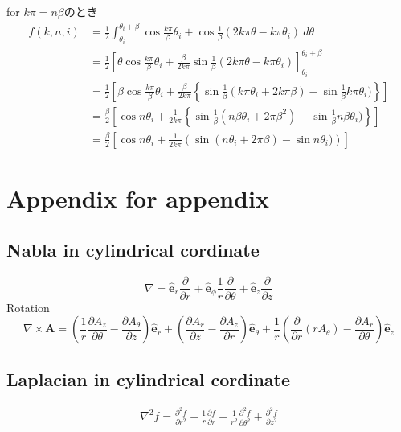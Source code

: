 \documentclass[a4paper, 11pt]{article}
\begin{document}
for $k\pi= n\beta$のとき
\begin{align}
    f(k,n,i) &= \frac{1}{2}\int_{\theta_i}^{\theta_i+\beta} \cos\frac{k\pi}{\beta}\theta_i + \cos \frac{1}{\beta} (2k\pi\theta-k\pi\theta_i)~d\theta\\
    & = \frac{1}{2}\left[\theta\cos\frac{k\pi}{\beta}\theta_i + \frac{\beta}{2k\pi}\sin\frac{1}{\beta} (2k\pi\theta-k\pi\theta_i)\right]_{\theta_i}^{\theta_i+\beta}\\
    & = \frac{1}{2}\left[\beta\cos\frac{k\pi}{\beta}\theta_i + \frac{\beta}{2k\pi}\left\{\sin\frac{1}{\beta} (k\pi\theta_i+2k\pi\beta)-\sin \frac{1}{\beta}k\pi\theta_i)\right\}\right]\\ 
    & = \frac{\beta}{2}\left[\cos n\theta_i + \frac{1}{2k\pi}\left\{\sin\frac{1}{\beta} (n\beta\theta_i+2\pi\beta^2)-\sin \frac{1}{\beta}n\beta\theta_i)\right\}\right]\\ 
    & = \frac{\beta}{2}\left[\cos n\theta_i + \frac{1}{2k\pi}\left(\sin(n\theta_i+2\pi\beta)-\sin n\theta_i)\right)\right]
\end{align}

\color{Black}





\section{Appendix for appendix}
\subsection{Nabla in cylindrical cordinate}
$$
\nabla = \hat{\mathbf{e}}_{r} \frac{\partial}{\partial r} + \hat{\mathbf{e}}_{\phi} \frac{1}{r} \frac{\partial}{\partial \theta} + \hat{\mathbf{e}}_{z} \frac{\partial}{\partial z}
$$
Rotation
$$
\nabla \times \mathbf{A} = \left( \frac{1}{r} \frac{\partial A_{z}}{\partial \theta} - \frac{\partial A_{\theta}}{\partial z} \right) \hat{\mathbf{e}}_{r} + \left( \frac{\partial A_{r}}{\partial z} - \frac{\partial A_{z}}{\partial r} \right) \hat{\mathbf{e}}_{\theta} + \frac{1}{r} \left( \frac{\partial}{\partial r} (r A_{\theta}) - \frac{\partial A_{r}}{\partial \theta} \right) \hat{\mathbf{e}}_{z}
$$

\subsection{Laplacian in cylindrical cordinate}
\begin{align}
    \nabla^2 f = \frac{\partial^2 f}{\partial r^2} + \frac{1}{r} \frac{\partial f}{\partial r} + \frac{1}{r^2} \frac{\partial^2 f}{\partial \theta^2} + \frac{\partial^2 f}{\partial z^2}
\end{align}
\end{document}
